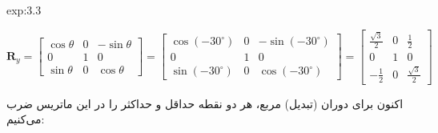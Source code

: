 {\begin{spacing}{1.5}
\begin{example}{exp:3.3}
            \begin{center}
                $\textbf{R}_{y}=\begin{bmatrix}
                                    \cos\theta & 0 & -\sin\theta \\
                                    0          & 1 & 0           \\
                                    \sin\theta & 0 & \cos\theta
                \end{bmatrix}=\begin{bmatrix}
                                  \cos(-30^\circ) & 0 & -\sin(-30^\circ) \\
                                  0               & 1 & 0                \\
                                  \sin(-30^\circ) & 0 & \cos(-30^\circ)
                \end{bmatrix}=\begin{bmatrix}
                                  \frac{\displaystyle \sqrt{\displaystyle 3}}{\displaystyle 2} & 0 & \frac{\displaystyle 1}{\displaystyle 2}                      \\
                                  0                                                            & 1 & 0                                                            \\
                                  -\frac{\displaystyle 1}{\displaystyle 2}                     & 0 & \frac{\displaystyle \sqrt{\displaystyle 3}}{\displaystyle 2}
                \end{bmatrix}$
            \end{center}

            اکنون برای دوران (تبدیل) مربع، هر دو نقطه حداقل و حداکثر را در این ماتریس ضرب می‌کنیم:


\end{example}
\end{spacing}}
